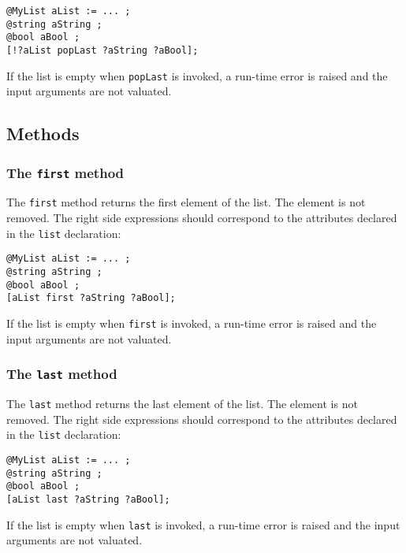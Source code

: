 \begin{lstlisting}[language=galgas]
@MyList aList := ... ;
@string aString ;
@bool aBool ;
[!?aList popLast ?aString ?aBool];
\end{lstlisting}

If the list is empty when \lstinline[language=galgas]!popLast! is invoked, a run-time error is raised and the input arguments are not valuated.

\subsection{Methods}

\subsubsection{The \lstinline[language=galgas]!first! method}

The \lstinline[language=galgas]!first! method returns the first element of the list. The element is not removed. The right side expressions should correspond to the attributes declared in the \lstinline[language=galgas]!list! declaration:

\begin{lstlisting}[language=galgas]
@MyList aList := ... ;
@string aString ;
@bool aBool ;
[aList first ?aString ?aBool];
\end{lstlisting}

If the list is empty when \lstinline[language=galgas]!first! is invoked, a run-time error is raised and the input arguments are not valuated.

\subsubsection{The \lstinline[language=galgas]!last! method}

The \lstinline[language=galgas]!last! method returns the last element of the list. The element is not removed. The right side expressions should correspond to the attributes declared in the \lstinline[language=galgas]!list! declaration:\\

\begin{lstlisting}[language=galgas]
@MyList aList := ... ;
@string aString ;
@bool aBool ;
[aList last ?aString ?aBool];
\end{lstlisting}


If the list is empty when \lstinline[language=galgas]!last! is invoked, a run-time error is raised and the input arguments are not valuated.








